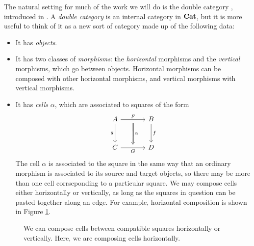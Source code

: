 \documentclass{article}
\begin{document}
The natural setting for much of the work we will do is the double category \MonCat, introduced in \cite{AdjointsInDoubleCategories}.  
A \emph{double category} is an internal category in ${\normalfont\textbf{Cat}}$, but it is more useful to think of it as a new sort of category made up of the following data:
\begin{itemize}
  \item It has \emph{objects}.
  \item It has two classes of \emph{morphisms}: the \emph{horizontal} morphisms and the \emph{vertical} morphisms, which go between objects.  
    Horizontal morphisms can be composed with other horizontal morphisms, and vertical morphisms with vertical morphisms.
  \item It has \emph{cells} $\alpha$, which are associated to squares of the form
    \[
      \begin{tikzcd}[row sep=large, column sep=large]
        A \arrow[r, "F", ""'{name=F}] \arrow[d, "g"']
          & B \arrow[d, "f"] \\
        C \arrow[r, "G"', ""{name=G}]
          & D
        \arrow[Rightarrow, from=F, to=G, "\alpha"]
      \end{tikzcd}
      \]
    The cell $\alpha$ is associated to the square in the same way that an ordinary morphism is associated to its source and target objects, so there may be more than one cell corrseponding to a particular square.  
    We may compose cells either horizontally or vertically, as long as the squares in question can be pasted together along an edge.  
    For example, horizontal composition is shown in Figure \ref{fig:horizontal-cell-composition}.
\end{itemize}

\begin{figure}
  \caption{We can compose cells between compatible squares horizontally or vertically.  
  Here, we are composing cells horizontally.}
  \label{fig:horizontal-cell-composition}
\end{figure}
\end{document}
